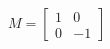 \documentclass[preview]{standalone}
\begin{document}
\begin{align*}
M = \begin{bmatrix} 1 & 0 \\ 0 & -1 \end{bmatrix}
\end{align*}
\end{document}
